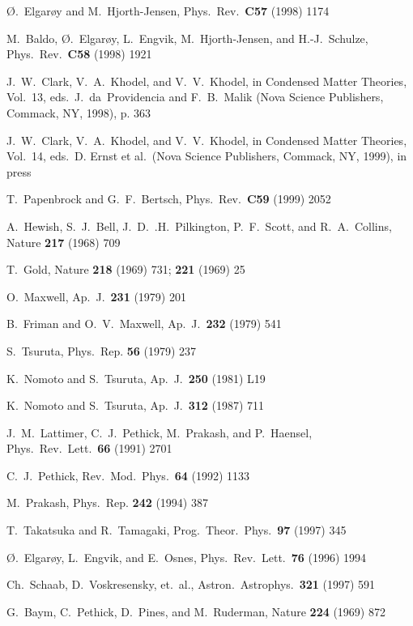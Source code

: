 \begin{thebibliography}{999}
 {\O}.~Elgar{\o}y and M.~Hjorth-Jensen, 
Phys.\ Rev.\ {\bf C57} (1998) 1174

M.~Baldo, {\O}.~Elgar{\o}y, L.~Engvik, M.~Hjorth-Jensen, and 
H.-J.~Schulze, Phys.\ Rev.\ {\bf C58} (1998) 1921

 J.~W.~Clark, V.~A.~Khodel, and V.~V.~Khodel, in
Condensed Matter Theories, Vol.\ 13, eds.\ J.~da~Providencia and
F.~B.~Malik (Nova Science Publishers, Commack, NY, 1998), p. 363

 J.~W.~Clark, V.~A.~Khodel, and V.~V.~Khodel, in
Condensed Matter Theories, Vol.\ 14, eds.\ D. Ernst et al.\
(Nova Science Publishers, Commack, NY, 1999), in press 

T.~Papenbrock and G.~F.~Bertsch, Phys.\ Rev.\ {\bf C59} (1999) 2052

 A.~Hewish, S.~J.~Bell, J.~D.~.H.~Pilkington, P.~F.~Scott,
and R.~A.~Collins, Nature {\bf 217} (1968) 709

 T.~Gold, Nature {\bf 218} (1969) 731; {\bf 221} (1969) 25

 O.~Maxwell, Ap.~J.\ {\bf 231} (1979) 201

 B.~Friman and O.~V.~Maxwell, Ap.~J.\ {\bf 232}
(1979) 541

 S.~Tsuruta, Phys.~Rep. {\bf 56} (1979) 237

 K.~Nomoto and S.~Tsuruta, Ap.~J.\ {\bf 250}
(1981) L19

 K.~Nomoto and S.~Tsuruta, Ap.~J.\ {\bf 312} 
(1987) 711

 J.~M.~Lattimer, C.~J.~Pethick, M.~Prakash,
and P.~Haensel, Phys.\ Rev.\ Lett.\ {\bf 66} (1991) 2701

 C.~J.~Pethick, Rev.\ Mod.\ Phys.\ {\bf 64} (1992) 1133

 M.~Prakash, Phys.~Rep. {\bf 242} (1994) 387

T.~Takatsuka and R.~Tamagaki, Prog.\ Theor.\ Phys.\ {\bf 97} (1997) 345

{\O}.~Elgar{\o}y, L.~Engvik, and E.~Osnes, Phys.\ Rev.\ Lett.\ {\bf 76} 
(1996) 1994

 Ch.~Schaab, D.~Voskresensky, et.~al.,
Astron.\ Astrophys.\ {\bf 321} (1997) 591

G.~Baym, C.~Pethick, D.~Pines, and M.~Ruderman, Nature {\bf 224} (1969) 872


\end{thebibliography}

